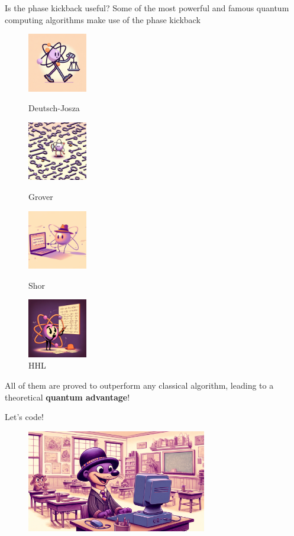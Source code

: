 \documentclass[aspectratio=169, 8pt, xcolor={svgnames}, hyperref={linkcolor=black}]{beamer}
\begin{document}
\begin{frame}{Is the phase kickback useful?}
Some of the most powerful and famous quantum computing algorithms make use of the phase kickback
\begin{multicols}{4}
\begin{figure}
   {\includegraphics[width=0.23\textwidth, height=0.4\textheight]{figures/dj.png}\caption{Deutsch-Josza}}
   {\includegraphics[width=0.23\textwidth, height=0.4\textheight]{figures/grover.png}\caption{Grover}}
   {\includegraphics[width=0.23\textwidth, height=0.4\textheight]{figures/shor.png}\caption{Shor}}
   {\includegraphics[width=0.23\textwidth, height=0.4\textheight]{figures/hhl.png}\caption{HHL}}
\end{figure}
\end{multicols}
All of them are proved to outperform any classical algorithm, leading to a theoretical \textbf{quantum 
advantage}!
\end{frame}

\begin{frame}
\centering
\Huge Let's code!
\begin{figure}
   \includegraphics[width=0.7\textwidth]{figures/hands_on.png}
\end{figure}
\end{frame}
\end{document}
